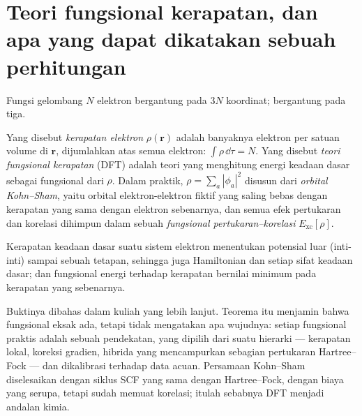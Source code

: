\section{Teori fungsional kerapatan, dan apa yang dapat dikatakan sebuah perhitungan}

Fungsi gelombang $N$ elektron bergantung pada $3N$ koordinat;  bergantung pada tiga.

\begin{definition}\label{def:b3:computational-chemistry:dft}
Yang disebut \emph{kerapatan elektron}
$\rho(\mathbf r)$ adalah banyaknya elektron per satuan volume di $\mathbf r$,
dijumlahkan atas semua elektron: $\int\rho\,\dd\tau = N$. Yang disebut
\emph{teori fungsional kerapatan} (DFT)
adalah teori yang menghitung energi keadaan dasar sebagai fungsional dari $\rho$. Dalam praktik,
$\rho = \sum_a|\phi_a|^2$ disusun dari \emph{orbital
Kohn--Sham}, yaitu orbital elektron-elektron fiktif yang saling bebas dengan
kerapatan yang sama dengan elektron sebenarnya, dan semua efek pertukaran dan
korelasi dihimpun dalam sebuah \emph{fungsional
pertukaran--korelasi} $E_{\mathrm{xc}}[\rho]$.
\end{definition}

\begin{theorem}\label{thm:b3:computational-chemistry:hohenberg-kohn}
Kerapatan keadaan dasar suatu sistem elektron menentukan potensial luar
(inti-inti) sampai sebuah tetapan, sehingga juga Hamiltonian dan setiap sifat
keadaan dasar; dan fungsional energi terhadap kerapatan bernilai minimum pada
kerapatan yang sebenarnya.
\end{theorem}
\admitted

Buktinya dibahas dalam kuliah yang lebih lanjut. Teorema itu menjamin bahwa
fungsional eksak ada, tetapi tidak mengatakan apa wujudnya: setiap fungsional
praktis adalah sebuah pendekatan, yang dipilih dari suatu hierarki ---
kerapatan lokal, koreksi gradien, hibrida yang mencampurkan sebagian
pertukaran Hartree--Fock --- dan dikalibrasi terhadap data acuan.
Persamaan Kohn--Sham diselesaikan dengan siklus SCF yang sama dengan
Hartree--Fock, dengan biaya yang serupa, tetapi sudah memuat korelasi;
itulah sebabnya DFT menjadi andalan kimia.

